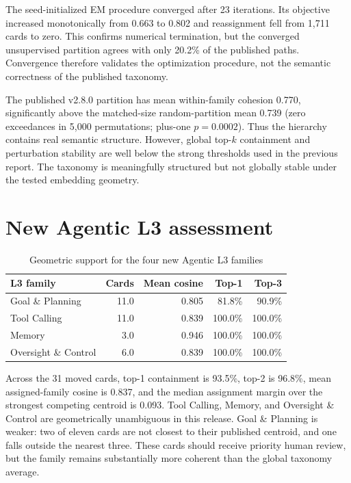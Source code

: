 \documentclass[10pt,a4paper]{article}
\newcommand{\pct}[1]{#1\%}
\begin{document}
The seed-initialized EM procedure converged after 23 iterations. Its objective increased monotonically from 0.663 to 0.802 and reassignment fell from 1,711 cards to zero. This confirms numerical termination, but the converged unsupervised partition agrees with only \pct{20.2} of the published paths. Convergence therefore validates the optimization procedure, not the semantic correctness of the published taxonomy.

The published v2.8.0 partition has mean within-family cohesion 0.770, significantly above the matched-size random-partition mean 0.739 (zero exceedances in 5,000 permutations; plus-one $p=0.0002$). Thus the hierarchy contains real semantic structure. However, global top-$k$ containment and perturbation stability are well below the strong thresholds used in the previous report. The taxonomy is meaningfully structured but not globally stable under the tested embedding geometry.

\section{New Agentic L3 assessment}
\begin{table}[ht]
\centering
\caption{Geometric support for the four new Agentic L3 families}
\begin{tabular}{lrrrr}
\toprule
L3 family & Cards & Mean cosine & Top-1 & Top-3 \\
\midrule
Goal \& Planning & 11.0 & 0.805 & \pct{81.8} & \pct{90.9} \\
Tool Calling & 11.0 & 0.839 & \pct{100.0} & \pct{100.0} \\
Memory & 3.0 & 0.946 & \pct{100.0} & \pct{100.0} \\
Oversight \& Control & 6.0 & 0.839 & \pct{100.0} & \pct{100.0} \\
\bottomrule
\end{tabular}
\end{table}

Across the 31 moved cards, top-1 containment is \pct{93.5}, top-2 is \pct{96.8}, mean assigned-family cosine is 0.837, and the median assignment margin over the strongest competing centroid is 0.093. Tool Calling, Memory, and Oversight \& Control are geometrically unambiguous in this release. Goal \& Planning is weaker: two of eleven cards are not closest to their published centroid, and one falls outside the nearest three. These cards should receive priority human review, but the family remains substantially more coherent than the global taxonomy average.
\end{document}
